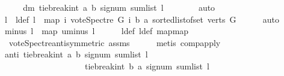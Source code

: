 \begin{isabellebody}
\ \ \isamarkupfalse%
\ \isamarkupfalse%
\ dm{\isacharcolon}{\kern0pt}\ {\isachardoublequoteopen}tie{\isacharunderscore}{\kern0pt}break{\isacharunderscore}{\kern0pt}int\ a\ b\ {\isacharparenleft}{\kern0pt}signum\ {\isacharparenleft}{\kern0pt}sum{\isacharunderscore}{\kern0pt}list\ l{\isacharparenright}{\kern0pt}{\isacharparenright}{\kern0pt}\ {\isasymin}\ {\isacharbraceleft}{\kern0pt}{\isacharminus}{\kern0pt}{}{\isacharcomma}{\kern0pt}{}{\isacharbraceright}{\kern0pt}{\isachardoublequoteclose}\isanewline
\ \ \ \ \isamarkupfalse%
\ auto\ \ \isanewline
\ \ \isamarkupfalse%
\ l{}\ \ l{}{\isacharunderscore}{\kern0pt}def{\isacharcolon}{\kern0pt}\ {\isachardoublequoteopen}l{}\ {\isacharequal}{\kern0pt}\ {\isacharparenleft}{\kern0pt}map\ {\isacharparenleft}{\kern0pt}{\isasymlambda}i{\isachardot}{\kern0pt}\ vote{\isacharunderscore}{\kern0pt}Spectre\ G\ i\ b\ a{\isacharparenright}{\kern0pt}\ {\isacharparenleft}{\kern0pt}sorted{\isacharunderscore}{\kern0pt}list{\isacharunderscore}{\kern0pt}of{\isacharunderscore}{\kern0pt}set\ {\isacharparenleft}{\kern0pt}verts\ G{\isacharparenright}{\kern0pt}{\isacharparenright}{\kern0pt}{\isacharparenright}{\kern0pt}{\isachardoublequoteclose}\isanewline
\ \ \ \ \isamarkupfalse%
\ auto\isanewline
\ \ \isamarkupfalse%
\ minus{\isacharcolon}{\kern0pt}\ {\isachardoublequoteopen}l{}\ {\isacharequal}{\kern0pt}\ map\ uminus\ l{\isachardoublequoteclose}\isanewline
\ \ \ \ \isamarkupfalse%
\ l{\isacharunderscore}{\kern0pt}def\ l{}{\isacharunderscore}{\kern0pt}def\ map{\isacharunderscore}{\kern0pt}map\isanewline
\ \ \ \ \isamarkupfalse%
\ \ vote{\isacharunderscore}{\kern0pt}Spectre{\isacharunderscore}{\kern0pt}antisymmetric\ assms{\isacharparenleft}{\kern0pt}{}{\isacharparenright}{\kern0pt}\isanewline
\ \ \ \ \isamarkupfalse%
\ {\isacharparenleft}{\kern0pt}metis\ comp{\isacharunderscore}{\kern0pt}apply{\isacharparenright}{\kern0pt}\ \ \isanewline
\ \ \isamarkupfalse%
\ anti{\isacharcolon}{\kern0pt}\ {\isachardoublequoteopen}tie{\isacharunderscore}{\kern0pt}break{\isacharunderscore}{\kern0pt}int\ a\ b\ {\isacharparenleft}{\kern0pt}signum\ {\isacharparenleft}{\kern0pt}sum{\isacharunderscore}{\kern0pt}list\ l{\isacharparenright}{\kern0pt}{\isacharparenright}{\kern0pt}\ {\isacharequal}{\kern0pt}\ \isanewline
\ \ \ \ \ \ \ \ \ \ \ \ \ \ \ \ \ \ \ {\isacharminus}{\kern0pt}\ tie{\isacharunderscore}{\kern0pt}break{\isacharunderscore}{\kern0pt}int\ b\ a\ {\isacharparenleft}{\kern0pt}signum\ {\isacharparenleft}{\kern0pt}sum{\isacharunderscore}{\kern0pt}list\ l{}{\isacharparenright}{\kern0pt}{\isacharparenright}{\kern0pt}{\isachardoublequoteclose}\ \isamarkupfalse%

\end{isabellebody}
